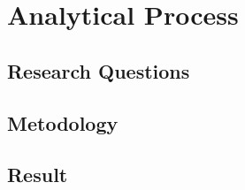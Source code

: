 \section{Analytical Process}
\label{sec:analytical_process}

\subsection{Research Questions}
\label{sec:research_questions}

\subsection{Metodology}
\label{sec:metodology}

\subsection{Result}
\label{sec:result}
